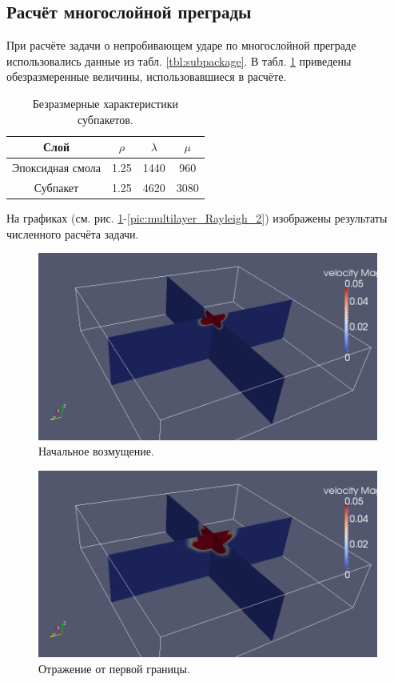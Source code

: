 \subsection{Расчёт многослойной преграды}
При расчёте задачи о непробивающем ударе по многослойной преграде использовались
данные из табл. \ref{tbl:subpackage}. В табл. \ref{tbl:subpackage_2} приведены
обезразмеренные величины, использовавшиеся в расчёте.
\begin{table}[h]
\centering
\begin{tabular}{|c|c|c|c|}
\hline
Слой & $\rho$ & $\lambda$ & $\mu$  \\
\hline
Эпоксидная смола & 1.25 & 1440 & 960 \\
Субпакет & 1.25 & 4620 & 3080 \\
\hline
\end{tabular}
\caption{Безразмерные характеристики субпакетов.}
\label{tbl:subpackage_2}
\end{table}
На графиках (см. рис. \ref{pic:multilayer_init}-\ref{pic:multilayer_Rayleigh_2})
изображены результаты численного расчёта задачи.
\begin{figure}[htp]
\centering
\includegraphics[width=\textwidth]{png/v-0001.png}
\caption{Начальное возмущение.}
\label{pic:multilayer_init}
\end{figure}
\begin{figure}[htp]
\centering
\includegraphics[width=\textwidth]{png/v-0003.png}
\caption{Отражение от первой границы.}
\label{pic:multilayer_b1}
\end{figure}
